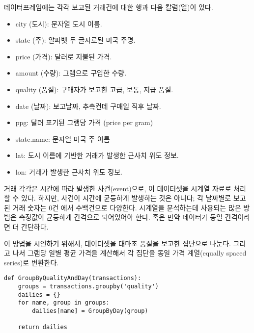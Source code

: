 데이터프레임에는 각각 보고된 거래건에 대한 행과 다음 칼럼(열)이 있다.

\begin{itemize}

\item city (도시): 문자열 도시 이름.

\item state (주): 알파벳 두 글자로된 미국 주명.

\item price (가격): 달러로 지불된 가격.

\item amount (수량): 그램으로 구입한 수량.

\item quality (품질): 구매자가 보고한 고급, 보통, 저급 품질.

\item date (날짜): 보고날짜, 추측컨데 구매일 직후 날짜.

\item ppg: 달러 표기된 그램당 가격 (price per gram)

\item state.name: 문자열 미국 주 이름

\item lat: 도시 이름에 기반한 거래가 발생한 근사치 위도 정보.

\item lon: 거래가 발생한 근사치 위도 정보.

\end{itemize}

거래 각각은 시간에 따라 발생한 사건(event)으로, 이 데이터셋을 시계열 자료로 처리할 수 있다. 하지만, 사건이 시간에 균등하게 발생하는 것은 아니다; 각 날짜별로 보고된 거래 숫자는 0건 에서 수백건으로 다양한다. 시계열을 분석하는데 사용되는 많은 방법은 측정값이 균등하게 간격으로 되어있어야 한다. 혹은 만약 데이터가 동일 간격이라면 더 간단하다.


이 방법을 시연하기 위해서, 데이터셋을 대마초 품질을 보고한 집단으로 나눈다. 그리고 나서 그램당 일별 평균 가격을 계산해서 각 집단을 동일 가격 계열(equally spaced series)로 변환한다.

\begin{verbatim}
def GroupByQualityAndDay(transactions):
    groups = transactions.groupby('quality')
    dailies = {}
    for name, group in groups:
        dailies[name] = GroupByDay(group)        

    return dailies
\end{verbatim}

